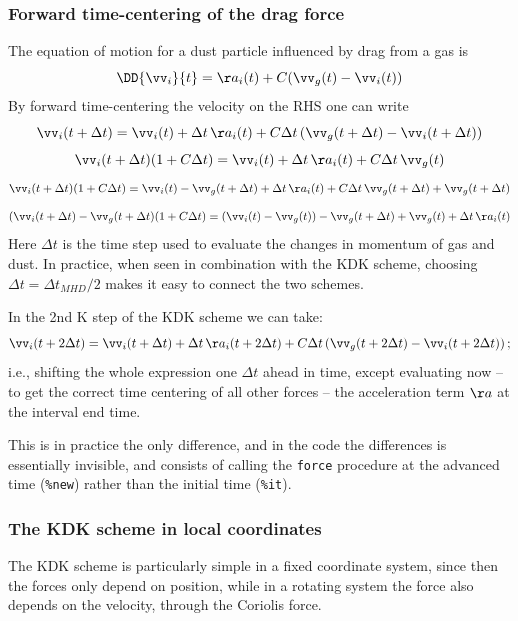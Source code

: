 \documentclass[paper=a4,fontsize=11pt]{scrartcl}
\numberwithin{equation}{section}		%
\numberwithin{figure}{section}			%
\numberwithin{table}{section}				%
\newcommand{\codecolor}{\color{Blue}}
\newcommand{\Code}[1]{{\codecolor\texttt{#1}}}
\begin{document}
\subsubsection{Forward time-centering of the drag force}
The equation of motion for a dust particle influenced by drag from a gas is
\begin{equation}
    \DD{\vv_i}{t} = \aa_i(t) + C (\vv_g(t) - \vv_i(t))
\end{equation}
By forward time-centering the velocity on the RHS one can write
\begin{equation}
    \vv_i(t+\Delta t) = \vv_i(t) + \Delta t\,\aa_i(t) + C\Delta t\, (\vv_g(t+\Delta t) - \vv_i(t+\Delta t))
\end{equation}
\begin{equation}
    \vv_i(t+\Delta t)(1+C\Delta t) = \vv_i(t) + \Delta t\,\aa_i(t) + C\Delta t\, \vv_g(t)
\end{equation}
\begin{equation}
    \vv_i(t+\Delta t)(1+C\Delta t) = \vv_i(t)-\vv_g(t+\Delta t) + \Delta t\,\aa_i(t) + C\Delta t\, \vv_g(t+\Delta t) + \vv_g(t+\Delta t)
\end{equation}
\begin{equation}
    (\vv_i(t+\Delta t)-\vv_g(t+\Delta t)(1+C\Delta t) = (\vv_i(t)-\vv_g(t)) -\vv_g(t+\Delta t)+\vv_g(t) + \Delta t\,\aa_i(t) 
\end{equation}
Here $\Delta t$ is the time step used to evaluate the changes in momentum of gas and dust.  In practice, when seen in combination with the KDK scheme, choosing $\Delta t=\Delta t_{MHD}/2$ makes it easy to connect the two schemes.

In the 2nd K step of the KDK scheme we can take:
\begin{equation}
    \vv_i(t+2\Delta t) = \vv_i(t+\Delta t) + \Delta t\,\aa_i(t+2\Delta t) + C\Delta t\, (\vv_g(t+2\Delta t) - \vv_i(t+2\Delta t))\,;
\end{equation}
i.e., shifting the whole expression one $\Delta t$ ahead in time, except evaluating now -- to get the correct time centering of all other forces -- the acceleration term $\aa$ at the interval end time.  

This is in practice the only difference, and in the code the differences is essentially invisible, and consists of calling the \Code{force} procedure at the advanced time (\Code{\%new}) rather than the initial time (\Code{\%it}).

\subsubsection{The KDK scheme in local coordinates}
The KDK scheme is particularly simple in a fixed coordinate system, since then the forces only depend on position, while in a rotating system the force also depends on the velocity, through the Coriolis force.
\end{document}
